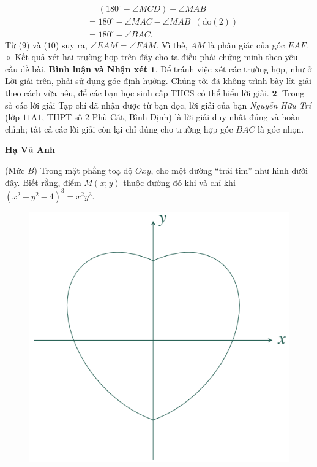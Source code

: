 \begin{multicols}{2}
\begin{align*}
		&= \left( {{{180}^{\circ}} - \angle MCD} \right) - \angle MAB\\[-0.5ex]
		&= {180^{\circ}} \!-\! \angle MAC \!-\! \angle MAB\,\,\,({\text{do}}(2))\\[-0.5ex]
		&= {180^{\circ}} - \angle BAC. \tag{$10$}
	\end{align*}
	Từ ($9$) và ($10$) suy ra, $\angle EAM = \angle FAM$.  Vì thế, $AM$ là phân giác của góc $EAF$.
	\vskip 0.05cm
	$\diamond$ Kết quả xét hai trường hợp trên đây cho ta điều phải chứng minh theo yêu cầu đề bài.
	\vskip 0.05cm
	\textbf{\color{thachthuctoanhoc}Bình luận và Nhận xét}
	\vskip 0.05cm
	$\pmb{1.}$ Để tránh việc xét các trường hợp, như ở Lời giải trên, phải sử dụng góc định hướng. Chúng tôi đã không trình bày lời giải theo cách vừa nêu, để các bạn học sinh cấp THCS có thể hiểu lời giải.
	\vskip 0.05cm
	$\pmb{2.}$ Trong số các lời giải Tạp chí đã nhận được từ bạn đọc, lời giải của bạn \textit{Nguyễn Hữu Trí} (lớp $11$A$1$, THPT số $2$ Phù Cát, Bình Định) là lời giải duy nhất đúng và hoàn chỉnh; tất cả các lời giải còn lại chỉ đúng cho trường hợp góc $BAC$ là góc nhọn.
	\begin{flushright}
		\textbf{\color{thachthuctoanhoc}Hạ Vũ Anh}
	\end{flushright}
	{}
	(Mức $B$) Trong mặt phẳng toạ độ $Oxy$, cho một đường ``trái tim'' như hình dưới đây. Biết rằng, điểm $M(x;y)$ thuộc đường đó khi và chỉ khi $\left(x^2\!+\!y^2\!-\!4\right)^{\!3}\!=\! x^2y^3$. 
	\begin{figure}[H]
		\centering
		\vspace*{-5pt}
		\captionsetup{labelformat= empty, justification=centering}
		\includegraphics[width=0.75\linewidth]{P1}

\end{figure}
\end{multicols}
